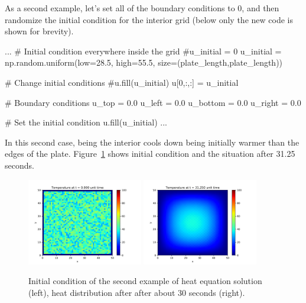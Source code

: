 As a second example, let’s set all of the boundary conditions to 0, and then randomize the initial condition for the interior grid (below only the new code is shown for brevity).

\begin{ipython}
...
# Initial condition everywhere inside the grid
#u_initial = 0
u_initial = np.random.uniform(low=28.5, high=55.5, size=(plate_length,plate_length))

# Change initial conditions
#u.fill(u_initial)
u[0,:,:] = u_initial

# Boundary conditions
u_top = 0.0
u_left = 0.0
u_bottom = 0.0
u_right = 0.0

# Set the initial condition
u.fill(u_initial)
...
\end{ipython}

In this second case, being the interior cools down being initially warmer than the edges of the plate. Figure~\ref{fig:heat_2} shows initial condition and the situation after 31.25 seconds.
 
\begin{figure}[htb]
	\centering
	\includegraphics[width=0.45\textwidth]{figures/frame0_2}
	\includegraphics[width=0.45\textwidth]{figures/frame250_2}
	\caption{Initial condition of the second example of heat equation solution (left), heat distribution after  after about 30 seconds (right).}
	\label{fig:heat_2}
\end{figure} 

